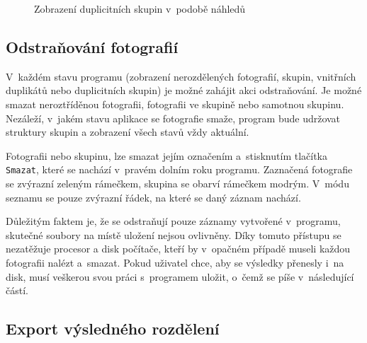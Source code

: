 \begin{figure}[h]
\begin{center}
\caption{Zobrazení duplicitních skupin v~podobě náhledů}
\label{DSK_P}
\end{center}
\end{figure}

\subsection*{Odstraňování fotografií}

V~každém stavu programu (zobrazení nerozdělených fotografií, skupin, vnitřních duplikátů nebo duplicitních skupin) je možné zahájit akci odstraňování. Je možné smazat neroztříděnou fotografii, fotografii ve skupině nebo samotnou skupinu. Nezáleží, v~jakém stavu aplikace se fotografie smaže, program bude udržovat struktury skupin a zobrazení všech stavů vždy aktuální.

Fotografii nebo skupinu, lze smazat jejím označením a~stisknutím tlačítka \texttt{Smazat}, které se nachází v~pravém dolním roku programu. Zaznačená fotografie se zvýrazní zeleným rámečkem, skupina se obarví rámečkem modrým. V~módu seznamu se pouze zvýrazní řádek, na které se daný záznam nachází.

Důležitým faktem je, že se odstraňují pouze záznamy vytvořené v~programu, skutečné soubory na místě uložení nejsou ovlivněny. Díky tomuto přístupu se nezatěžuje procesor a disk počítače, kteří by v~opačném případě museli každou fotografii nalézt a~smazat. Pokud uživatel chce, aby se výsledky přenesly i~na disk, musí veškerou svou práci s~programem uložit, o~čemž se píše v~následující částí.  

\subsection*{Export výsledného rozdělení}

